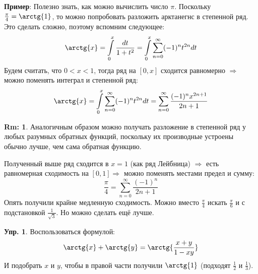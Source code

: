 \documentclass[12pt]{article}
\theoremstyle{definition}
\newtheorem{rem}{Rm:}
\newtheorem{exrc}{Упр.}
\newcommand{\ddsum}[2]{\displaystyle\sum\limits_{#1}^{#2}}
\newcommand{\ddint}[2]{\displaystyle\int\limits_{#1}^{#2}}
\begin{document}
\textbf{Пример}: Полезно знать, как можно вычислить число $\pi$. Поскольку $\tfrac{\pi}{4} = \arctg{1}$, то можно попробовать разложить арктанегнс в степенной ряд. Это сделать сложно, поэтому вспомним следующее:
$$
	\arctg{x} = \ddint{0}{x}\dfrac{dt}{1+t^2} = \ddint{0}{x}\ddsum{n = 0}{\infty}(-1)^nt^{2n}dt
$$
Будем считать, что $0 < x < 1$, тогда ряд на $[0,x]$ сходится равномерно $\Rightarrow$ можно поменять интеграл и степенной ряд:
$$
	\arctg{x} = \ddint{0}{x}\ddsum{n = 0}{\infty}(-1)^nt^{2n}dt = \ddsum{n = 0}{\infty}\dfrac{(-1)^n x^{2n + 1}}{2n +1}
$$
\begin{rem}
	Аналогичным образом можно получать разложение в степенной ряд у любых разумных обратных функций, поскольку их производные устроены обычно лучше, чем сама обратная функцию.
\end{rem}
Полученный выше ряд сходится в $x = 1$ (как ряд Лейбница) $\Rightarrow$ есть равномерная сходимость на $[0,1] \Rightarrow$ можно поменять местами предел и сумму:
$$
	\dfrac{\pi}{4} = \ddsum{n = 0}{\infty}\dfrac{(-1)^n}{2n + 1}
$$
Опять получили крайне медленную сходимость. Можно вместо $\tfrac{\pi}{4}$ искать $\tfrac{\pi}{6}$ и с подстановкой $\tfrac{1}{\sqrt{3}}$. Но можно сделать ещё лучше.
\begin{exrc}
	Воспользоваться формулой:
	$$
		\arctg{x} + \arctg{y} = \arctg{\dfrac{x + y}{1 - xy}}
	$$
	И подобрать $x$ и $y$, чтобы в правой части получили $\arctg{1}$ \Big(подходят $\tfrac{1}{2}$ и $\tfrac{1}{3}$\Big). 
\end{exrc}

\newpage
\end{document}
